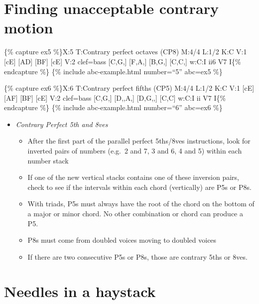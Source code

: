 \documentclass{book}
\providecommand{\tightlist}{%
  \setlength{\itemsep}{0pt}\setlength{\parskip}{0pt}}
\begin{document}
\hypertarget{finding-unacceptable-contrary-motion}{%
\section{Finding unacceptable contrary
motion}\label{finding-unacceptable-contrary-motion}}

\{\% capture ex5 \%\}X:5 T:Contrary perfect octaves (CP8) M:4/4 L:1/2 K:C V:1
{[}cE{]} {[}AD{]}\textbar{} {[}BF{]} {[}cE{]}\textbar{]} V:2 clef=bass
{[}C,G,{]} {[}F,A,{]} \textbar{} {[}B,G,{]} {[}C,C,{]}\textbar{]} w:C:I ii6 V7
I\{\% endcapture \%\} \{\% include abc-example.html number=``5'' abc=ex5 \%\}

\{\% capture ex6 \%\}X:6 T:Contrary perfect fifths (CP5) M:4/4 L:1/2 K:C V:1
{[}cE{]} {[}AF{]}\textbar{} {[}BF{]} {[}cE{]}\textbar{]} V:2 clef=bass
{[}C,G,{]} {[}D,,A,{]} \textbar{} {[}D,G,,{]} {[}C,C{]}\textbar{]} w:C:I ii V7
I\{\% endcapture \%\} \{\% include abc-example.html number=``6'' abc=ex6 \%\}

\begin{itemize}
\tightlist
\item
  \emph{Contrary Perfect 5th and 8ves}

  \begin{itemize}
  \tightlist
  \item
    After the first part of the parallel perfect 5ths/8ves instructions, look
    for inverted pairs of numbers (e.g.~2 and 7, 3 and 6, 4 and 5) within each
    number stack
  \item
    If one of the new vertical stacks contains one of these inversion pairs,
    check to see if the intervals within each chord (vertically) are P5s or
    P8s.
  \item
    With triads, P5s must always have the root of the chord on the bottom of a
    major or minor chord. No other combination or chord can produce a P5.
  \item
    P8s must come from doubled voices moving to doubled voices
  \item
    If there are two consecutive P5s or P8s, those are contrary 5ths or 8ves.
  \end{itemize}
\end{itemize}

\hypertarget{needles-in-a-haystack}{%
\section{Needles in a haystack}\label{needles-in-a-haystack}}
\end{document}
